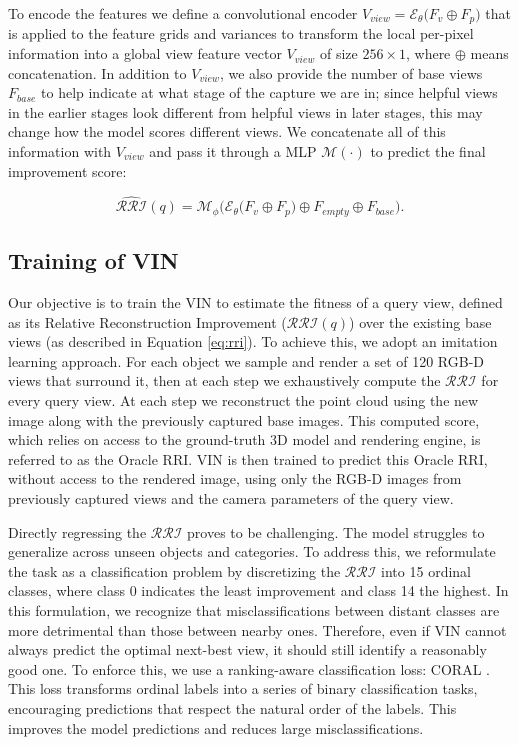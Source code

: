 To encode the features we define a convolutional encoder $V_{view} = \mathcal{E}_\theta\bigl(F_v \oplus F_p\bigr)$ that is applied to the feature grids and variances to transform the local per-pixel information into a global view feature vector $V_{view}$ of size $256\times1$, where $\oplus$ means concatenation. In addition to $V_{view}$, we also provide the number of base views $F_{base}$ to help indicate at what stage of the capture we are in; since helpful views in the earlier stages look different from helpful views in later stages, this may change how the model scores different views. We concatenate all of this information with $V_{view}$ and pass it through a MLP $\mathcal{M}(\cdot)$ to predict the final improvement score:

\vspace{-1.2em}
\begin{equation}
\widehat{\mathcal{RRI}}(q) = \mathcal{M}_\phi\bigl( \mathcal{E}_\theta\bigl(F_v \oplus F_p\bigr) \oplus F_{empty} \oplus F_{base}).
\end{equation}

\subsection{Training of VIN} \label{ssec:vin_training}
\vspace{-0.25em}

Our objective is to train the VIN to estimate the fitness of a query view, defined as its Relative Reconstruction Improvement ($\mathcal{RRI}(q)$) over the existing base views (as described in Equation \ref{eq:rri}). To achieve this, we adopt an imitation learning approach. For each object we sample and render a set of 120 RGB-D views that surround it, then at each step we
exhaustively compute the $\mathcal{RRI}$ for every query view. At each step we reconstruct the point cloud using the new image along with the previously captured base images. This computed score, which relies on access to the ground-truth 3D model and rendering engine, is referred to as the Oracle RRI. VIN is then trained to predict this Oracle RRI, without access to the rendered image, using only the RGB-D images from previously captured views and the camera parameters of the query view.

Directly regressing the $\mathcal{RRI}$ proves to be challenging. The model struggles to generalize across unseen objects and categories. To address this, we reformulate the task as a classification problem by discretizing the $\mathcal{RRI}$ into 15 ordinal classes, where class 0 indicates the least improvement and class 14 the highest. In this formulation, we recognize that misclassifications between distant classes are more detrimental than those between nearby ones. Therefore, even if VIN cannot always predict the optimal next-best view, it should still identify a reasonably good one. To enforce this, we use a ranking-aware classification loss: CORAL \cite{coral2020}. This loss transforms ordinal labels into a series of binary classification tasks, encouraging predictions that respect the natural order of the labels. This improves the model predictions and reduces large misclassifications.

